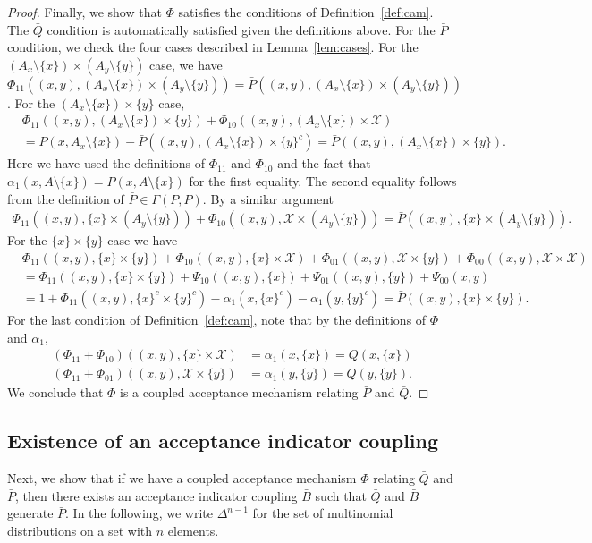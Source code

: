\documentclass[aihp]{imsart}
\theoremstyle{plain}
\theoremstyle{remark}
\theoremstyle{definition} \newtheorem{example}{Example}
\newcommand{\eq}[1]{\begin{align*}#1\end{align*}} %
\newcommand{\calX}{\mathcal{X}}
\newcommand{\bp}{\bar P}
\newcommand{\bq}{\bar Q}
\newcommand{\bb}{\bar B}
\newcommand{\sm}{\setminus}
\newcommand{\sx}{\{ x \}}
\newcommand{\sy}{\{ y \}}
\newcommand{\xy}{(x,y)}
\newcommand{\axm}{(A_x\! \setminus\! \sx)}
\newcommand{\aym}{(A_y\! \setminus\! \sy)}
\newcommand{\axym}{\axm \times \aym}
\begin{document}
\begin{proof}
Finally, we show that $\Phi$ satisfies the conditions of Definition~\ref{def:cam}. The $\bq$
condition is automatically satisfied given the definitions above. For the $\bp$ condition, we check
the four cases described in Lemma~\ref{lem:cases}. For the $\axym$ case, we have
$\Phi_{11}(\xy, \axym) = \bp(\xy, \axym)$.
For the $\axm \times \sy$ case,
\eq{
	& \Phi_{11}(\xy, \axm \times \sy) + \Phi_{10}(\xy, \axm \times \calX) \\
	& = P(x, A_x \sm \sx) - \bp(\xy, \axm \times \sy^c)
	= \bp(\xy, \axm \times \sy).
}
Here we have used the definitions of $\Phi_{11}$ and $\Phi_{10}$ and the fact that $\alpha_1(x, A
\sm \sx) = P(x, A \sm \sx)$ for the first equality. The second equality follows from the definition
of $\bp \in \Gamma(P,P)$. By a similar argument
\eq{
	\Phi_{11}(\xy, \sx \times \aym) + \Phi_{10}(\xy, \calX \times \aym) = \bp(\xy, \sx \times \aym).
}
For the $\sx \times \sy$ case we have
\eq{
	& \Phi_{11}(\xy, \sx\! \times\! \sy) + \Phi_{10}(\xy, \sx\! \times\! \calX)
	+ \Phi_{01}(\xy, \calX\! \times\! \sy) + \Phi_{00}(\xy, \calX \! \times \! \calX) \\
	& = \Phi_{11}(\xy, \sx \times \sy) + \Psi_{10}(\xy, \sx) + \Psi_{01}(\xy, \sy) + \Psi_{00}(x,y) \\
	& = 1 + \Phi_{11}(\xy, \sx^c \times \sy^c) - \alpha_1(x, \sx^c) - \alpha_1(y, \sy^c)
	= \bp(\xy, \sx \times \sy).
}
For the last condition of Definition~\ref{def:cam}, note that by the definitions of $\Phi$ and
$\alpha_1$,
\eq{
	(\Phi_{11} + \Phi_{10}) (\xy, \sx \times \calX) & = \alpha_1(x, \sx) = Q(x, \sx) \\
	(\Phi_{11} + \Phi_{01}) (\xy, \calX \times \sy) & = \alpha_1(y, \sy) = Q(y ,\sy).
}
We conclude that $\Phi$ is a coupled acceptance mechanism relating $\bp$ and $\bq$.
\end{proof}


\subsection{Existence of an acceptance indicator coupling}

Next, we show that if we have a coupled acceptance mechanism $\Phi$ relating $\bq$ and $\bp$, then
there exists an acceptance indicator coupling $\bb$ such that $\bq$ and $\bb$ generate $\bp$. In the
following, we write $\Delta^{n-1}$ for the set of multinomial distributions on a set with $n$
elements.

\smallskip
\end{document}
